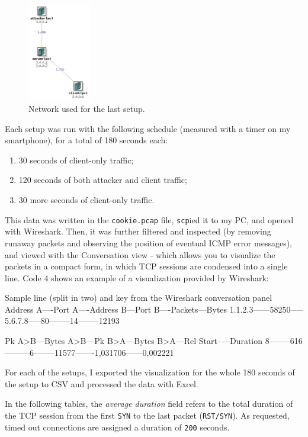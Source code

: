 \documentclass[a4paper,11pt,hidelinks]{article}
\begin{document}
\begin{figure}[h!]
  \centering
  \includegraphics[width=0.25\textwidth]{../drawable/network-extra2.png}
  \caption{Network used for the last setup.}
\end{figure}


Each setup was run with the following schedule (measured with a timer on my smartphone), for a total of 180 seconds each:

\begin{enumerate}
  \item 30 seconds of client-only traffic;
  \item 120 seconds of both attacker and client traffic;
  \item 30 more seconds of client-only traffic.
\end{enumerate}

This data was written in the \verb=cookie.pcap= file, \verb=scp=ied it to my PC, and opened with Wireshark. Then, it was further filtered and inspected (by removing runaway packets and observing the position of eventual ICMP error messages), and viewed with the Conversation view - which allows you to visualize the packets in a compact form, in which TCP sessions are condensed into a single line. Code 4 shows an example of a visualization provided by Wireshark:

\begin{code}{Sample line (split in two) and key from the Wireshark conversation panel}
  Address A----Port A----Address B---Port B----Packets---Bytes
  1.1.2.3------58250-----5.6.7.8-----80--------14--------12193

  Pk A>B---Bytes A>B---Pk B>A---Bytes B>A---Rel Start-----Duration
  8--------616---------6--------11577-------1,031706------0,002221
\end{code}

For each of the setups, I exported the visualization for the whole 180 seconds of the setup to CSV and processed the data with Excel.

In the following tables, the \textit{average duration} field refers to the total duration of the TCP session from the first \verb=SYN= to the last packet (\verb=RST/SYN=). As requested, timed out connections are assigned a duration of \verb=200= seconds.
\end{document}
